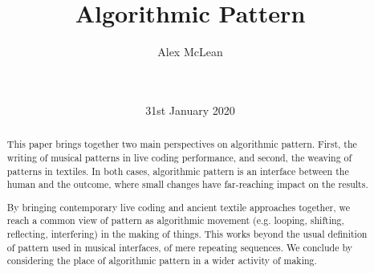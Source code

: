 \documentclass{nime-alternate} %
\begin{document}
\title{Algorithmic Pattern}

%
\author{
\alignauthor
Alex McLean\\
       \\
       \\
}

\date{31st January 2020}

\maketitle
\begin{abstract}
This paper brings together two main perspectives on algorithmic
pattern. First, the writing of musical patterns in live coding
performance, and second, the weaving of patterns in textiles. In both
cases, algorithmic pattern is an interface between the human and the
outcome, where small changes have far-reaching impact on the results.

By bringing contemporary live coding and ancient textile approaches
together, we reach a common view of pattern as algorithmic movement
(e.g. looping, shifting, reflecting, interfering) in the making of
things. This works beyond the usual definition of pattern used in
musical interfaces, of mere repeating sequences. We conclude by
considering the place of algorithmic pattern in a wider activity of
making.

\end{abstract}


\end{document}

